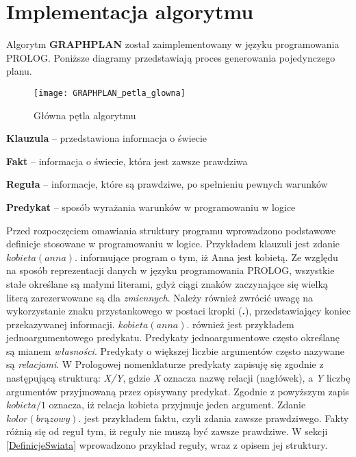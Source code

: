 \section{Implementacja algorytmu}
    Algorytm \textbf{GRAPHPLAN} został zaimplementowany w języku programowania PROLOG. Poniższe diagramy przedstawiają proces  
    generowania pojedynczego planu.
    \begin{figure}[H]
        \label{PetlaGlowna}
        \texttt{[image: GRAPHPLAN\_petla\_glowna]}
        \centering
        \caption{Główna pętla algorytmu}
    \end{figure}

    \begin{definition}
        \label{Predykat}
        \textbf{Klauzula} -- przedstawiona informacja o świecie
    \end{definition}

    \begin{definition}
        \label{Fakt}
        \textbf{Fakt} -- informacja o świecie, która jest zawsze prawdziwa
    \end{definition}

    \begin{definition}
        \label{Regula}
        \textbf{Reguła} -- informacje, które są prawdziwe, po spełnieniu pewnych warunków
    \end{definition}

    \begin{definition}
        \label{Predykat}
        \textbf{Predykat} -- sposób wyrażania warunków w programowaniu w logice
    \end{definition}


    Przed rozpoczęciem omawiania struktury programu wprowadzono podstawowe definicje stosowane w programowaniu w logice. Przykładem klauzuli jest 
    zdanie $kobieta(anna).$ informujące program o tym, iż Anna jest kobietą. Ze względu na sposób reprezentacji danych w języku programowania PROLOG, 
    wszystkie stałe określane są małymi literami, gdyż ciągi znaków zaczynające się wielką literą zarezerwowane są dla \textit{zmiennych}. Należy 
    również zwrócić uwagę na wykorzystanie znaku przystankowego w postaci kropki (\textbf{.}), przedstawiający koniec przekazywanej informacji. 
    $kobieta(anna).$ również jest przykładem jednoargumentowego predykatu. Predykaty jednoargumentowe często określanę są mianem \textit{własności}.
    Predykaty o większej liczbie argumentów często nazywane są \textit{relacjami}. W Prologowej nomenklaturze predykaty zapisuję się zgodnie 
    z następującą strukturą: \textit{X/Y}, gdzie \textit{X} oznacza nazwę relacji (nagłówek), a \textit{Y} liczbę argumentów przyjmowaną przez 
    opisywany predykat. Zgodnie z powyższym zapis $kobieta/1$ oznacza, iż relacja kobieta przyjmuje jeden argument.
    Zdanie $kolor(brązowy).$ jest przykładem faktu, czyli zdania zawsze prawdziwego. Fakty różnią się od reguł tym, iż reguły nie muszą być zawsze prawdziwe.
    W sekcji \ref{DefinicjeSwiata} wprowadzono przykład reguły, wraz z opisem jej struktury. 

